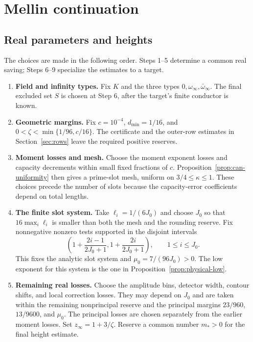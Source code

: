 \documentclass[11pt,a4paper]{article}
\numberwithin{equation}{section}
\theoremstyle{definition}
\theoremstyle{remark}
\begin{document}
\section{Mellin continuation}\label{sec:closure}

\subsection{Real parameters and heights}\label{subsec:parameter-order}

The choices are made in the following order. Steps 1--5 determine a
common real saving; Steps 6--9 specialize the estimates to a target.
\begin{enumerate}[label=\textup{\arabic*.},leftmargin=*,itemsep=5pt]
\item \textbf{Field and infinity types.}
Fix $K$ and the three types $0,\omega_\infty,\bar\omega_\infty$.
The final excluded set $S$ is chosen at Step 6, after the target's
finite conductor is known.

\item \textbf{Geometric margins.}
Fix $c=10^{-4}$, $d_{\min}=1/16$, and
$0<\zeta<\min\{1/96,c/16\}$. The certificate and the outer-row
estimates in Section~\ref{sec:rows} leave the required positive reserves.

\item \textbf{Moment losses and mesh.}
Choose the moment exponent losses and capacity decrements within small
fixed fractions of $c$. Proposition~\ref{prop:can-uniformity} then gives
a prime-slot mesh, uniform on $3/4\le\kappa\le1$. These choices precede
the number of slots because the capacity-error coefficients depend on
total lengths.

\item \textbf{The finite slot system.}
Take $\ell_i=1/(6J_0)$ and choose $J_0$ so that
$16\max_i\ell_i$ is smaller than both the mesh and the rounding reserve.
Fix nonnegative nonzero tests supported in the disjoint intervals
\[
 \left(1+\frac{2i-1}{2J_0+1},1+\frac{2i}{2J_0+1}\right),
 \qquad 1\le i\le J_0.
\]
This fixes the analytic slot system and
$\mu_0=7/(96J_0)>0$. The low exponent for this system is the one in
Proposition~\ref{prop:physical-low}.

\item \textbf{Remaining real losses.}
Choose the amplitude bins, detector width, contour shifts, and local
correction losses. They may depend on $J_0$ and are taken within the
remaining nonprincipal reserve and the principal margins
$23/960$, $13/9600$, and $\mu_0$. The principal losses are chosen
separately from the earlier moment losses. Set
$z_\infty=1+3/\zeta$. Reserve a common number $m_*>0$ for the final
height estimate.


\end{enumerate}
\end{document}
